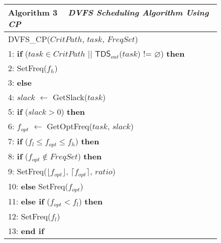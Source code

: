 \documentclass[12pt]{elsarticle}
\begin{document}
\begin{figure}
\centering
\begin{tabular}{@{}p{\columnwidth}@{}}
\toprule
\textbf{Algorithm 3} ~ \textit{DVFS Scheduling Algorithm Using CP}
\\\midrule
\textsf{DVFS\_CP}\textsf{(}$CritPath$, $task$, $FreqSet$\textsf{)}\\\hspace{2.09mm}1: \textbf{if} ($task \in CritPath$ $||$ $\mathsf{TDS}_{out}$\textsf{($task$)} != $\varnothing$) \textbf{then}\\
\hspace{2.09mm}2: \quad \textsf{SetFreq($f_h$)}\\
\hspace{2.09mm}3: \textbf{else}\\
\hspace{2.09mm}4: \quad $slack$ $\leftarrow$ \textsf{GetSlack($task$)}\\
\hspace{2.09mm}5: \quad \textbf{if} ($slack > 0$) \textbf{then}\\
\hspace{2.09mm}6: \quad\quad $f_{opt}$ $\leftarrow$ \textsf{GetOptFreq($task$, $slack$)}\\
\hspace{2.09mm}7: \quad \textbf{if} ($f_l \leq f_{opt} \leq f_h$) \textbf{then}\\
\hspace{2.09mm}8: \quad\quad \textbf{if} ($f_{opt} \notin FreqSet$) \textbf{then}\\
\hspace{2.09mm}9: \quad\quad\quad \textsf{SetFreq($\lfloor{f_{opt}}\rfloor$, $\lceil{f_{opt}}\rceil$, $ratio$)}\\
10: \quad\quad \textbf{else} \textsf{SetFreq($f_{opt}$)}\\11: \quad \textbf{else if} ($f_{opt} < f_l$) \textbf{then}\\
12: \quad\quad \textsf{SetFreq($f_l$)}\\
13: \textbf{end if}\\
\midrule
\end{tabular}
\end{figure}
\end{document}
